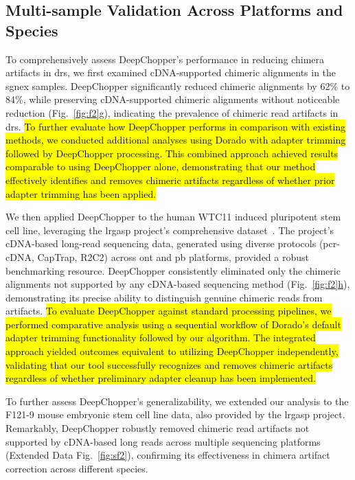 \documentclass[pdflatex,sn-nature, lineno]{sn-jnl}%
\newcommand{\figref}[2]{Fig.~\hyperref[#1]{\ref*{#1}#2}}
\newcommand{\edfigref}[2]{Extended Data Fig.~\hyperref[#1]{\ref*{#1}#2}}
\begin{document}
\subsection{Multi-sample Validation Across Platforms and Species}

To comprehensively assess DeepChopper’s performance in reducing chimera artifacts in \gls{drs}, we first examined cDNA-supported chimeric alignments in the \gls{sgnex} samples.
DeepChopper significantly reduced chimeric alignments by 62\% to 84\%, while preserving cDNA-supported chimeric alignments without noticeable reduction (\figref{fig:f2}{g}), indicating the prevalence of chimeric read artifacts in \gls{drs}.
\hl{To further evaluate how DeepChopper performs in comparison with existing methods, we conducted additional analyses using Dorado with adapter trimming followed by DeepChopper processing. This combined approach achieved results comparable to using DeepChopper alone, demonstrating that our method effectively identifies and removes chimeric artifacts regardless of whether prior adapter trimming has been applied.}

We then applied DeepChopper to the human WTC11 induced pluripotent stem cell line, leveraging the \gls{lrgasp} project's comprehensive dataset~\cite{pardo2024systematic}.
The project's cDNA-based long-read sequencing data, generated using diverse protocols (\gls{pcr}-cDNA, CapTrap, R2C2) across \gls{ont} and \gls{pb} platforms, provided a robust benchmarking resource. DeepChopper consistently eliminated only the chimeric alignments not supported by any cDNA-based sequencing method (\figref{fig:f2}{h}), demonstrating its precise ability to distinguish genuine chimeric reads from artifacts.
\hl{To evaluate DeepChopper against standard processing pipelines, we performed comparative analysis using a sequential workflow of Dorado's default adapter trimming functionality followed by our algorithm. The integrated approach yielded outcomes equivalent to utilizing DeepChopper independently, validating that our tool successfully recognizes and removes chimeric artifacts regardless of whether preliminary adapter cleanup has been implemented.}

To further assess DeepChopper's generalizability, we extended our analysis to the F121-9 mouse embryonic stem cell line data, also provided by the \gls{lrgasp} project.
Remarkably, DeepChopper robustly removed chimeric read artifacts not supported by cDNA-based long reads across multiple sequencing platforms (\edfigref{fig:sf2}{}), confirming its effectiveness in chimera artifact correction across different species.
\end{document}
